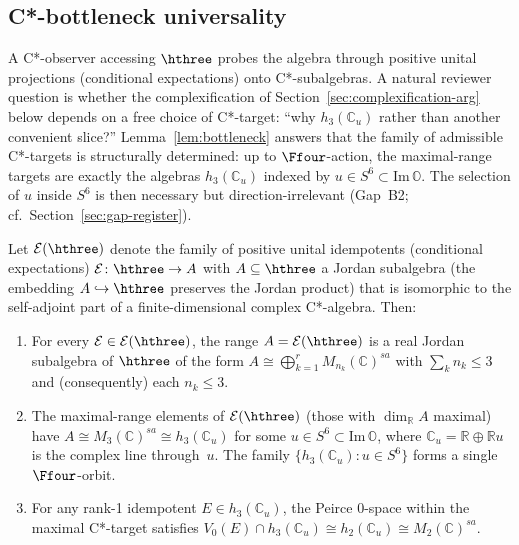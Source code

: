 \subsection{C*-bottleneck universality}\label{sec:bottleneck}

A C*-observer accessing $\hthree$ probes the algebra through positive
unital projections (conditional expectations) onto C*-subalgebras.
A natural reviewer question is whether the complexification of
Section~\ref{sec:complexification-arg} below depends on a free choice
of C*-target: ``why $h_3(\mathbb{C}_u)$ rather than another convenient
slice?''  Lemma~\ref{lem:bottleneck} answers that the family of
admissible C*-targets is structurally determined: up to
$\Ffour$-action, the maximal-range targets are exactly the algebras
$h_3(\mathbb{C}_u)$ indexed by $u\in S^6\subset\mathrm{Im}\,\mathbb{O}$.
The selection of $u$ inside $S^6$ is then necessary but
direction-irrelevant (Gap~B2; cf.~Section~\ref{sec:gap-register}).

\begin{lemma}\label{lem:bottleneck}
Let $\mathcal{E}(\hthree)$ denote the family of positive unital
idempotents (conditional expectations)
$\mathcal{E}\colon\hthree\to A$ with $A\subseteq\hthree$ a Jordan
subalgebra (the embedding $A\hookrightarrow\hthree$ preserves the
Jordan product) that is isomorphic to the self-adjoint part of a
finite-dimensional complex C*-algebra.  Then:
\begin{enumerate}[label=(\roman*)]
  \item For every $\mathcal{E}\in\mathcal{E}(\hthree)$, the range
    $A=\mathcal{E}(\hthree)$ is a real Jordan subalgebra of
    $\hthree$ of the form
    $A\cong\bigoplus_{k=1}^{r} M_{n_k}(\mathbb{C})^{sa}$ with
    $\sum_k n_k\leq 3$ and (consequently) each $n_k\leq 3$.
  \item The maximal-range elements of $\mathcal{E}(\hthree)$
    (those with $\dim_{\mathbb{R}} A$ maximal) have
    $A\cong M_3(\mathbb{C})^{sa}\cong h_3(\mathbb{C}_u)$ for some
    $u\in S^6\subset\mathrm{Im}\,\mathbb{O}$, where
    $\mathbb{C}_u=\mathbb{R}\oplus\mathbb{R}u$ is the complex line
    through~$u$.  The family $\{h_3(\mathbb{C}_u):u\in S^6\}$ forms
    a single $\Ffour$-orbit.
  \item For any rank-1 idempotent $E\in h_3(\mathbb{C}_u)$, the
    Peirce 0-space within the maximal C*-target satisfies
    $V_0(E)\cap h_3(\mathbb{C}_u)\cong h_2(\mathbb{C}_u)\cong
    M_2(\mathbb{C})^{sa}$.
\end{enumerate}
\end{lemma}

